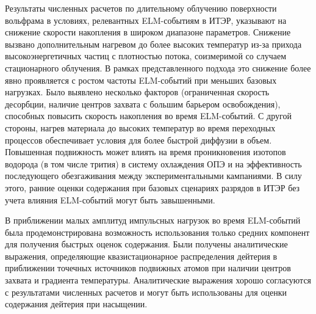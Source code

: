 Результаты численных расчетов по длительному облучению поверхности вольфрама в условиях, релевантных ELM-событиям в ИТЭР, указывают на снижение скорости накопления в широком диапазоне параметров. Снижение вызвано дополнительным нагревом до более высоких температур из-за прихода высокоэнергетичных частиц с плотностью потока, соизмеримой со случаем стационарного облучения. В рамках представленного подхода это снижение более явно проявляется с ростом частоты ELM-событий при меньших базовых нагрузках. Было выявлено несколько факторов (ограниченная скорость десорбции, наличие центров захвата с большим барьером освобождения), способных повысить скорость накопления во время ELM-событий. С другой стороны, нагрев материала до высоких температур во время переходных процессов обеспечивает условия для более быстрой диффузии в объем. Повышенная подвижность может влиять на время проникновения изотопов водорода (в том числе трития) в систему охлаждения ОПЭ и на эффективность последующего обезгаживания между экспериментальными кампаниями. В силу этого, ранние оценки содержания при базовых сценариях разрядов в ИТЭР без учета влияния ELM-событий могут быть завышенными. 

В приближении малых амплитуд импульсных нагрузок во время ELM-событий была продемонстрирована возможность использования только средних компонент для получения быстрых оценок содержания. Были получены аналитические выражения, определяющие квазистационарное распределения дейтерия в приближении точечных источников подвижных атомов при наличии центров захвата и градиента температуры. Аналитические выражения хорошо согласуются с результатами численных расчетов и могут быть использованы для оценки содержания дейтерия при насыщении.

\clearpage
